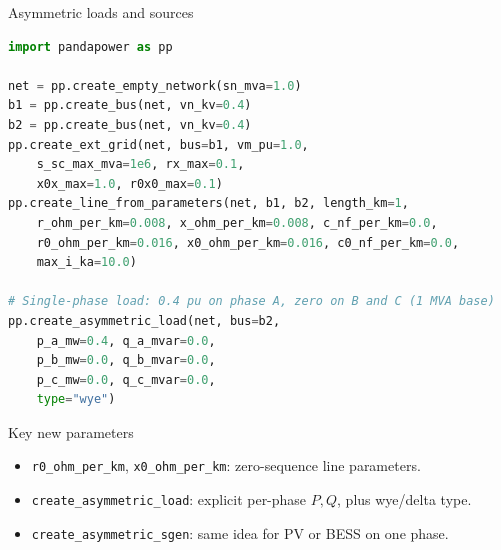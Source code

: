 \documentclass[aspectratio=169,10pt]{beamer}
\newcommand{\code}[1]{\texttt{#1}}
\begin{document}
\begin{frame}[fragile,shrink=8]{Asymmetric loads and sources}
\begin{lstlisting}[language=Python]
import pandapower as pp

net = pp.create_empty_network(sn_mva=1.0)
b1 = pp.create_bus(net, vn_kv=0.4)
b2 = pp.create_bus(net, vn_kv=0.4)
pp.create_ext_grid(net, bus=b1, vm_pu=1.0,
    s_sc_max_mva=1e6, rx_max=0.1,
    x0x_max=1.0, r0x0_max=0.1)
pp.create_line_from_parameters(net, b1, b2, length_km=1,
    r_ohm_per_km=0.008, x_ohm_per_km=0.008, c_nf_per_km=0.0,
    r0_ohm_per_km=0.016, x0_ohm_per_km=0.016, c0_nf_per_km=0.0,
    max_i_ka=10.0)

# Single-phase load: 0.4 pu on phase A, zero on B and C (1 MVA base)
pp.create_asymmetric_load(net, bus=b2,
    p_a_mw=0.4, q_a_mvar=0.0,
    p_b_mw=0.0, q_b_mvar=0.0,
    p_c_mw=0.0, q_c_mvar=0.0,
    type="wye")
\end{lstlisting}
\begin{block}{Key new parameters}
\begin{itemize}
  \item \code{r0\_ohm\_per\_km}, \code{x0\_ohm\_per\_km}: zero-sequence line parameters.
  \item \code{create\_asymmetric\_load}: explicit per-phase $P, Q$, plus wye/delta type.
  \item \code{create\_asymmetric\_sgen}: same idea for PV or BESS on one phase.
\end{itemize}
\end{block}
\end{frame}
\end{document}
